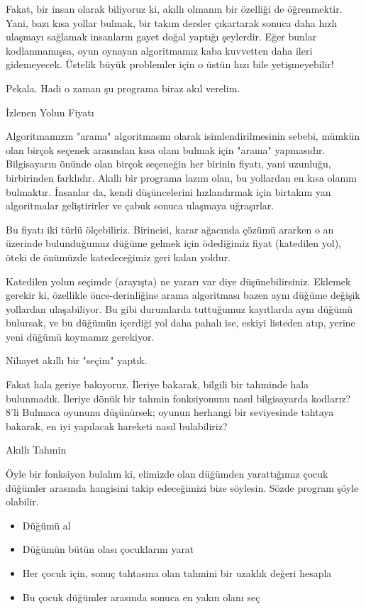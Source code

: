 \documentclass[12pt,fleqn]{article}\usepackage{../../common}
\begin{document}
Fakat, bir insan olarak biliyoruz ki, akıllı olmanın bir özelliği de
öğrenmektir. Yani, bazı kısa yollar bulmak, bir takım dersler çıkartarak
sonuca daha hızlı ulaşmayı sağlamak insanların gayet doğal yaptığı
şeylerdir. Eğer bunlar kodlanmamışsa, oyun oynayan algoritmamız kaba
kuvvetten daha ileri gidemeyecek. Üstelik büyük problemler için o üstün
hızı bile yetişmeyebilir!

Pekala. Hadi o zaman şu programa biraz akıl verelim.

İzlenen Yolun Fiyatı

Algoritmamızın "arama" algoritmasını olarak isimlendirilmesinin sebebi,
mümkün olan birçok seçenek arasından kısa olanı bulmak için "arama"
yapmasıdır. Bilgisayarın önünde olan birçok seçeneğin her birinin fiyatı,
yani uzunluğu, birbirinden farklıdır. Akıllı bir programa lazım olan, bu
yollardan en kısa olanını bulmaktır. İnsanlar da, kendi düşüncelerini
hızlandırmak için birtakım yan algoritmalar geliştirirler ve çabuk sonuca
ulaşmaya uğraşırlar.

Bu fiyatı iki türlü ölçebiliriz. Birincisi, karar ağacında çözümü ararken o
an üzerinde bulunduğumuz düğüme gelmek için ödediğimiz fiyat (katedilen
yol), öteki de önümüzde katedeceğimiz geri kalan yoldur.

Katedilen yolun seçimde (arayışta) ne yararı var diye
düşünebilirsiniz. Eklemek gerekir ki, özellikle önce-derinliğine arama
algoritması bazen aynı düğüme değişik yollardan ulaşabiliyor. Bu gibi
durumlarda tuttuğumuz kayıtlarda aynı düğümü bulursak, ve bu düğümün
içerdiği yol daha pahalı ise, eskiyi listeden atıp, yerine yeni düğümü
koymamız gerekiyor.

Nihayet akıllı bir "seçim" yaptık.

Fakat hala geriye bakıyoruz. İleriye bakarak, bilgili bir tahminde hala
bulunmadık. İleriye dönük bir tahmin fonksiyonunu nasıl bilgisayarda kodlarız?
8'li Bulmaca oyununu düşünürsek; oyunun herhangi bir seviyesinde tahtaya
bakarak, en iyi yapılacak hareketi nasıl bulabiliriz?

Akıllı Tahmin

Öyle bir fonksiyon bulalım ki, elimizde olan düğümden yarattığımız çocuk
düğümler arasında hangisini takip edeceğimizi bize söylesin. Sözde program
şöyle olabilir.

\begin{itemize}
   \item Düğümü al
   \item Düğümün bütün olası çocuklarını yarat
   \item Her çocuk için, sonuç tahtasına olan tahmini bir uzaklık değeri
     hesapla
   \item Bu çocuk düğümler arasında sonuca en yakın olanı seç
\end{itemize}
\end{document}
